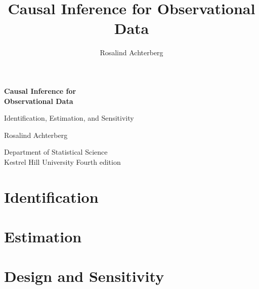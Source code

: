 \documentclass[11pt,a4paper,twoside,openright]{book}
\title{Causal Inference for Observational Data}
\author{Rosalind Achterberg}
\theoremstyle{plain}
\theoremstyle{definition}
\theoremstyle{remark}
\begin{document}
\frontmatter

\begin{titlepage}
\centering
\vspace*{3cm}
{\Huge\bfseries Causal Inference for\\[0.4cm] Observational Data\par}
\vspace{1.0cm}
{\Large Identification, Estimation, and Sensitivity\par}
\vspace{3.5cm}
{\Large Rosalind Achterberg\par}
\vspace{0.5cm}
{\large Department of Statistical Science\\ Kestrel Hill University}
\vfill
{\large Fourth edition}
\end{titlepage}



\tableofcontents
\listoffigures
\listoftables

\mainmatter

\part{Identification}
\label{part:identification}



\part{Estimation}
\label{part:estimation}



\part{Design and Sensitivity}
\label{part:design}



\backmatter




\printindex
\end{document}
